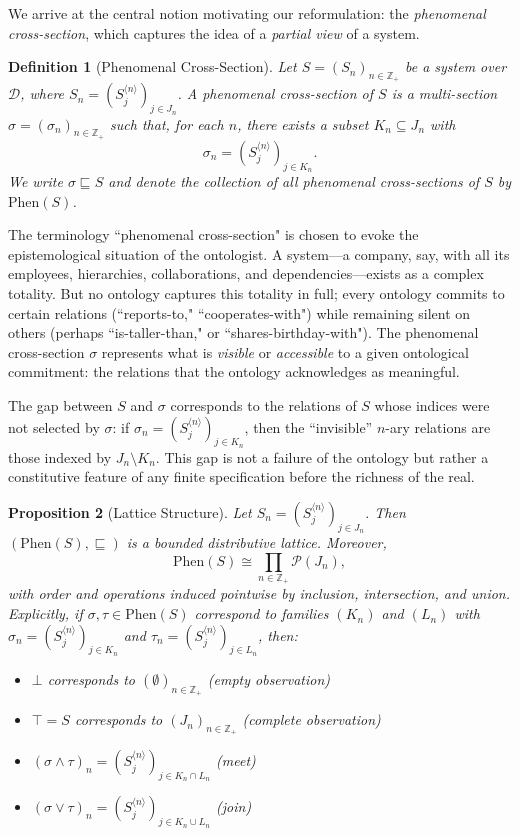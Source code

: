 \documentclass[12pt,a4paper]{article}
\newtheorem{definition}{Definition}[section]
\newtheorem{proposition}[definition]{Proposition}
\newcommand{\domain}{\mathcal{D}}
\newcommand{\powerset}{\mathcal{P}}
\newcommand{\Phen}{\mathrm{Phen}}
\begin{document}
We arrive at the central notion motivating our reformulation: the \emph{phenomenal cross-section}, which captures the idea of a \emph{partial view} of a system.

\begin{definition}[Phenomenal Cross-Section]
\label{def:phenom-cross-section}
Let $S=(S_n)_{n\in \mathbb{Z}_+}$ be a system over $\domain$, where $S_n=(S^{\langle n\rangle}_j)_{j\in J_n}$. A \emph{phenomenal cross-section} of $S$ is a multi-section $\sigma=(\sigma_n)_{n\in \mathbb{Z}_+}$ such that, for each $n$, there exists a subset $K_n\subseteq J_n$ with
$$
\sigma_n = (S^{\langle n\rangle}_j)_{j\in K_n}.
$$
We write $\sigma \sqsubseteq S$ and denote the collection of all phenomenal cross-sections of $S$ by $\Phen(S)$.
\end{definition}

The terminology ``phenomenal cross-section" is chosen to evoke the epistemological situation of the ontologist. A system---a company, say, with all its employees, hierarchies, collaborations, and dependencies---exists as a complex totality. But no ontology captures this totality in full; every ontology commits to certain relations (``reports-to," ``cooperates-with") while remaining silent on others (perhaps ``is-taller-than," or ``shares-birthday-with"). The phenomenal cross-section $\sigma$ represents what is \emph{visible} or \emph{accessible} to a given ontological commitment: the relations that the ontology acknowledges as meaningful.

The gap between $S$ and $\sigma$ corresponds to the relations of $S$ whose indices were not selected by $\sigma$: if $\sigma_n=(S^{\langle n\rangle}_j)_{j\in K_n}$, then the ``invisible'' $n$-ary relations are those indexed by $J_n\setminus K_n$. This gap is not a failure of the ontology but rather a constitutive feature of any finite specification before the richness of the real.

\begin{proposition}[Lattice Structure]
\label{prop:phen-lattice}
Let $S_n=(S^{\langle n\rangle}_j)_{j\in J_n}$. Then $(\Phen(S), \sqsubseteq)$ is a bounded distributive lattice. Moreover,
$$
\Phen(S)\cong \prod_{n\in \mathbb{Z}_+} \powerset(J_n),
$$
with order and operations induced pointwise by inclusion, intersection, and union. Explicitly, if $\sigma,\tau\in \Phen(S)$ correspond to families $(K_n)$ and $(L_n)$ with $\sigma_n=(S^{\langle n\rangle}_j)_{j\in K_n}$ and $\tau_n=(S^{\langle n\rangle}_j)_{j\in L_n}$, then:
\begin{itemize}
    \item $\bot$ corresponds to $(\emptyset)_{n\in \mathbb{Z}_+}$ \hfill (empty observation)
    \item $\top=S$ corresponds to $(J_n)_{n\in \mathbb{Z}_+}$ \hfill (complete observation)
    \item $(\sigma \wedge \tau)_n = (S^{\langle n\rangle}_j)_{j\in K_n \cap L_n}$ \hfill (meet)
    \item $(\sigma \vee \tau)_n = (S^{\langle n\rangle}_j)_{j\in K_n \cup L_n}$ \hfill (join)
\end{itemize}
\end{proposition}
\end{document}
